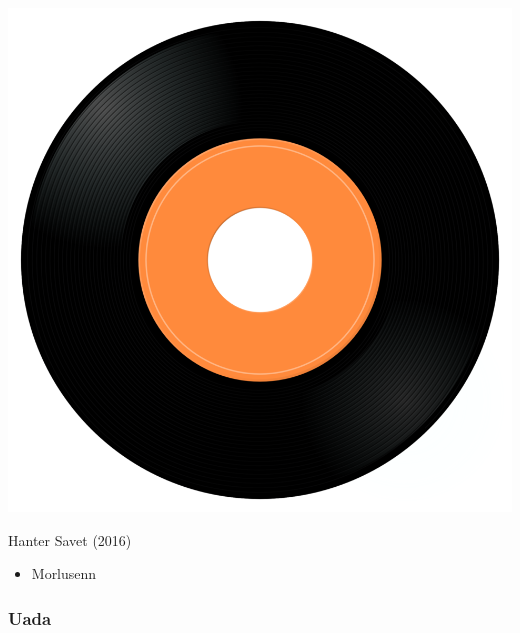 \begin{minipage}[t]{0.25\textwidth}
\captionsetup{type=figure}
\includegraphics[width=\textwidth]{Images/cover.png}
\caption*{Hanter Savet (2016)}
\end{minipage}
\begin{minipage}[t]{0.25\textwidth}\vspace{0pt}
\begin{itemize}[nosep,leftmargin=1em,labelwidth=*,align=left]
	\setlength{\itemsep}{0pt}
	\item Morlusenn 
\end{itemize}
\end{minipage}

\subsubsection{Uada}

